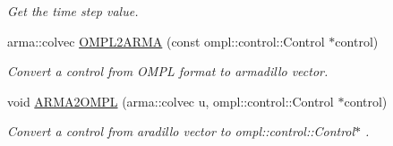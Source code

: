\begin{DoxyCompactItemize}
\begin{DoxyCompactList}\small\item\em \-Get the time step value. \end{DoxyCompactList}\item 
\hypertarget{class_motion_model_method_a924d7bb8eb665d12181c3755e831bc50}{arma\-::colvec \hyperlink{class_motion_model_method_a924d7bb8eb665d12181c3755e831bc50}{\-O\-M\-P\-L2\-A\-R\-M\-A} (const ompl\-::control\-::\-Control $\ast$control)}\label{class_motion_model_method_a924d7bb8eb665d12181c3755e831bc50}

\begin{DoxyCompactList}\small\item\em \-Convert a control from \-O\-M\-P\-L format to armadillo vector. \end{DoxyCompactList}\item 
\hypertarget{class_motion_model_method_af473fd665c4fa562143beef5733db523}{void \hyperlink{class_motion_model_method_af473fd665c4fa562143beef5733db523}{\-A\-R\-M\-A2\-O\-M\-P\-L} (arma\-::colvec u, ompl\-::control\-::\-Control $\ast$control)}\label{class_motion_model_method_af473fd665c4fa562143beef5733db523}

\begin{DoxyCompactList}\small\item\em \-Convert a control from aradillo vector to ompl\-::control\-::\-Control$\ast$ . \end{DoxyCompactList}\end{DoxyCompactItemize}
